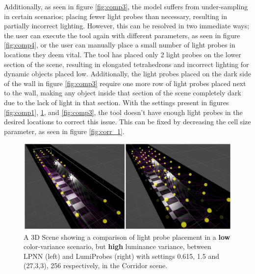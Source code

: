 Additionally, as seen in figure \ref{fig:comp3}, the model suffers from under-sampling in certain scenarios; placing fewer light probes than necessary, resulting in partially incorrect lighting. However, this can be resolved in two immediate ways; the user can execute the tool again with different parameters, as seen in figure \ref{fig:comp4}, or the user can manually place a small number of light probes in locations they deem vital. The tool has placed only 2 light probes on the lower section of the scene, resulting in elongated tetrahedrons and incorrect lighting for dynamic objects placed low. Additionally, the light probes placed on the dark side of the wall in figure \ref{fig:comp3} require one more row of light probes placed next to the wall, making any object inside that section of the scene completely dark due to the lack of light in that section. With the settings present in figures \ref{fig:comp1}, \ref{fig:comp2}, and \ref{fig:comp3}, the tool doesn't have enough light probes in the desired locations to correct this issue. This can be fixed by decreasing the cell size parameter, as seen in figure \ref{fig:corr_1}.

\begin{figure}[h]
	\centering
	\includegraphics[scale=0.25]{Graphics/results/concats/comparison2.png}
	\caption{A 3D Scene showing a comparison of light probe placement in a \textbf{low} color-variance scenario, but \textbf{high} luminance variance, between LPNN (left) and LumiProbes (right) with settings 0.615, 1.5 and (27,3,3), 256 respectively, in the Corridor scene.}
	\label{fig:comp2}
\end{figure}

